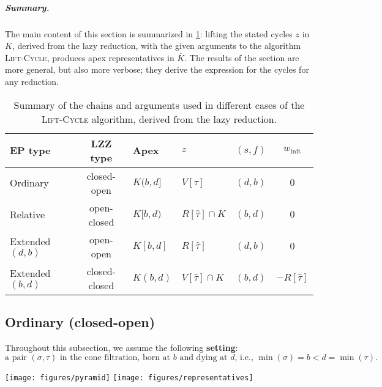 \documentclass[cleveref,a4paper,english,nolineno]{socg-lipics-v2021}
\newcommand{\ra}[1]{\renewcommand{\arraystretch}{#1}}
\renewcommand{\paragraph}[1]{\subparagraph*{#1}}
\newcommand{\prism}[1]{\overline{#1}}
\newcommand{\cone}[1]{\hat{#1}}
\newcommand{\pK}{\prism{K}}
\newcommand{\ssx}{\sigma}
\newcommand{\tsx}{\tau}
\newcommand{\ctsx}{\cone{\tsx}}
\newcommand{\algname}[1]{\textsc{#1}}
\newcommand{\winit}{w_\textrm{init}}
\begin{document}
\paragraph{Summary.}
The main content of this section is summarized in \cref{tbl:chain-summary}:
lifting the stated cycles $z$ in $K$, derived from the lazy reduction, with the
given arguments to the algorithm \algname{Lift-Cycle}, produces apex
representatives in $\pK$.
The results of the section are more general, but also more verbose; they derive the expression for the
cycles for any reduction.
\begin{table}[h]
    \centering
    \ra{1.3}    %
    \begin{tabular}{@{}lcll@{\quad}cc}
        \toprule
        EP type          & LZZ type      & Apex     & $z$               & $(s,f)$ & $\winit$\\
        \midrule
        Ordinary         & closed-open   & $K(b,d]$ & $V[\tsx]$         & $(d,b)$ & $0$ \\
        \midrule
        Relative         & open-closed   & $K[b,d)$ & $R[\ctsx] \cap K$ & $(b,d)$ & $0$ \\
        \midrule
        Extended $(d,b)$ & open-open     & $K[b,d]$ & $R[\ctsx]$        & $(d,b)$ & $0$ \\
        \midrule
        Extended $(b,d)$ & closed-closed & $K(b,d)$ & $V[\ctsx] \cap K$ & $(b,d)$ & $-R[\ctsx]$ \\
        \bottomrule
    \end{tabular}
    \caption{Summary of the chains and arguments used in different cases of the
    \algname{Lift-Cycle} algorithm, derived from the lazy reduction.}
    \label{tbl:chain-summary}
\end{table}

\subsection{Ordinary (closed-open)}
\label{sec:ordinary}

Throughout this subsection, we assume the following \textbf{setting}:
\[
    \text{a pair $(\ssx,\tsx)$ in the cone filtration, born at $b$ and dying at $d$, i.e., $\min(\ssx) = b < d = \min(\tsx)$.}
\]

    \texttt{[image: figures/pyramid]}
        \quad
    \texttt{[image: figures/representatives]}
\end{document}
